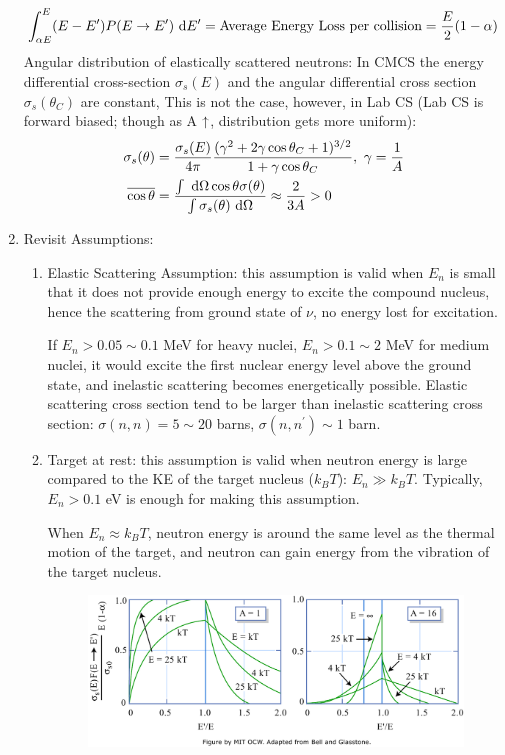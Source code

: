 \documentclass{school-22.101-notes}
\begin{document}
\begin{enumerate}
\begin{align}
    \int_{\alpha E}^E (E - E^{\prime}) P(E \to E^{\prime}) \mbox{ }\mathrm{d} E^{\prime} &= \mbox{Average Energy Loss per collision}  = \frac{E}{2} (1-\alpha) 
    \end{align}
Angular distribution of elastically scattered neutrons:
In CMCS the energy differential cross-section $\sigma_s(E)$ and the angular differential cross section $\sigma_s(\theta_C)$ are constant,
This is not the case, however, in Lab CS (Lab CS is forward biased; though as A $\uparrow$, distribution gets more uniform):
    \begin{align}
    \sigma_s (\theta) &= \frac{\sigma_s (E)}{4 \pi} \frac{(\gamma^2 + 2 \gamma \cos \theta_C + 1)^{3/2}}{1 + \gamma \cos \theta_C}, \mbox{ } \gamma = \frac{1}{A}  \\
    \overline{\cos \theta} &= \frac{\int \mbox{ }\mathrm{d} \Omega \cos \theta \sigma(\theta)}{\int \sigma_s (\theta) \mbox{ }\mathrm{d} \Omega} \approx \frac{2}{3A} > 0 
    \end{align}
%
%
\item Revisit Assumptions:
\begin{enumerate}
\item Elastic Scattering Assumption: this assumption is valid when $E_n$ is small that it does not provide enough energy to excite the compound nucleus, hence the scattering from ground state of $\nu$, no energy lost for excitation. 

If $E_n > 0.05 \sim 0.1$ MeV for heavy nuclei, $E_n > 0.1 \sim 2$ MeV for medium nuclei, it would excite the first nuclear energy level above the ground state, and inelastic scattering becomes energetically possible. Elastic scattering cross section tend to be larger than inelastic scattering cross section: $\sigma (n,n) = 5\sim20$ barns, $\sigma(n,n^{\prime}) \sim 1$ barn.

\item Target at rest: this assumption is valid when neutron energy is large compared to the KE of the target nucleus ($k_B T$): $E_n \gg k_B T$. Typically, $E_n > 0.1$ eV is enough for making this assumption. 

When $E_n \approx k_B T$, neutron energy is around the same level as the thermal motion of the target, and neutron can gain energy from the vibration of the target nucleus. 
\begin{figure}
    \centering
    \includegraphics[width=4in]{images/ni/lower-neutron-energy.png}
\end{figure}


\end{enumerate}
\end{enumerate}
\end{document}
